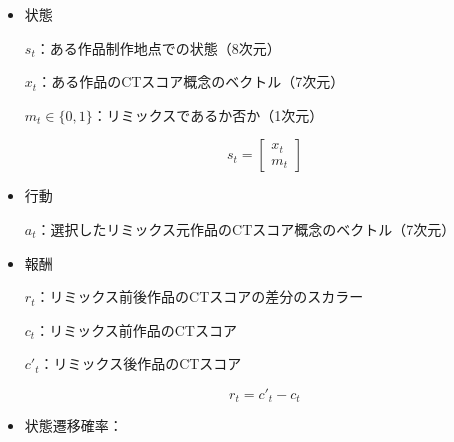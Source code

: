 \documentclass[submit,techrep,noauthor]{ipsj}
\begin{document}
\begin{itemize}
  \item 状態
    
    $s_t$：ある作品制作地点での状態（8次元）

    $x_t$：ある作品のCTスコア概念のベクトル（7次元）

    $m_t\in\{0,1\}$：リミックスであるか否か（1次元）

    \begin{equation}
        s_t = 
        \begin{bmatrix}
           x_t \\
           m_t 
        \end{bmatrix}
    \end{equation}

  \item 行動

    $a_t$：選択したリミックス元作品のCTスコア概念のベクトル（7次元）

  
  \item 報酬

    $r_t$：リミックス前後作品のCTスコアの差分のスカラー
    
    $c_t$：リミックス前作品のCTスコア

    $c'_t$：リミックス後作品のCTスコア
    
    \begin{equation}
        r_t = c'_t - c_t
    \end{equation}

    

    
  
  \item 状態遷移確率：
\end{itemize}



\end{document}
